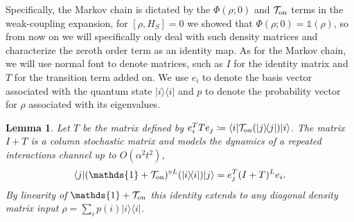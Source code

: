 \documentclass{article}
\newtheorem{lemma}[theorem]{Lemma}
\newcommand{\on}{\rm on}
\newcommand{\ket}[1]{|#1\rangle}
\newcommand{\bra}[1]{\langle #1|}
\newcommand{\ketbra}[2]{| #1\rangle\! \langle #2|}
\newcommand{\bigo}[1]{O\left(#1\right)}
\newcommand{\identity}{\mathds{1}}
\begin{document}
Specifically, the Markov chain is dictated by the $\Phi(\rho; 0)$ and $\mathcal{T}_{\on}$ terms in the weak-coupling expansion, for $[\rho, H_S] = 0$ we showed that $\Phi(\rho; 0) = \identity(\rho)$, so from now on we will specifically only deal with such density matrices and characterize the zeroth order term as an identity map. As for the Markov chain, we will use normal font to denote matrices, such as $I$ for the identity matrix and $T$ for the transition term added on. We use $e_i$ to denote the basis vector associated with the quantum state $\ketbra{i}{i}$ and $p$ to denote the probability vector for $\rho$ associated with its eigenvalues.
\begin{lemma} \label{lem:quantum_to_classical}
    Let $T$ be the matrix defined by $e_i^T T e_j \coloneqq \bra{i} \mathcal{T}_{\on}(\ketbra{j}{j}) \ket{i}$. The matrix $I + T$ is a column stochastic matrix and models the dynamics of a repeated interactions channel up to $\bigo{\alpha^2 t^2}$,
    \begin{equation}
        \bra{j} (\identity + \mathcal{T}_{\on})^{\circ L} (\ketbra{i}{i}) \ket{j} = e_j^T (I + T)^L e_i.
    \end{equation}
    By linearity of $\identity + \mathcal{T}_{\on}$ this identity extends to any diagonal density matrix input $\rho = \sum_i p(i) \ketbra{i}{i}$.
\end{lemma}
\end{document}
